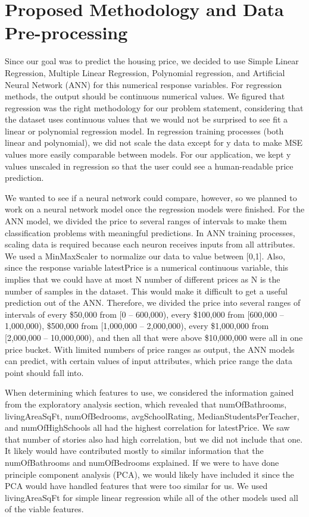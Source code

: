 \documentclass[12pt]{article}
\begin{document}
	\section{Proposed Methodology and Data Pre-processing}
	
	Since our goal was to predict the housing price, we decided to use Simple Linear Regression, Multiple Linear Regression, Polynomial regression, and Artificial Neural Network (ANN) for this numerical response variables. For regression methods, the output should be continuous numerical values. We figured that regression was the right methodology for our problem statement, considering that the dataset uses continuous values that we would not be surprised to see fit a linear or polynomial regression model. In regression training processes (both linear and polynomial), we did not scale the data except for y data to make MSE values more easily comparable between models. For our application, we kept y values unscaled in regression so that the user could see a human-readable price prediction.
	
	We wanted to see if a neural network could compare, however, so we planned to work on a neural network model once the regression models were finished. For the ANN model, we divided the price to several ranges of intervals to make them classification problems with meaningful predictions. In ANN training processes, scaling data is required because each neuron receives inputs from all attributes. We used a MinMaxScaler to normalize our data to value between [0,1]. Also, since the response variable latestPrice is a numerical continuous variable, this implies that we could have at most N number of different prices as N is the number of samples in the dataset. This would make it difficult to get a useful prediction out of the ANN. Therefore, we divided the price into several ranges of intervals of every \$50,000 from [0 – 600,000), every \$100,000 from [600,000 – 1,000,000), \$500,000 from [1,000,000 – 2,000,000), every \$1,000,000 from [2,000,000 – 10,000,000), and then all that were above \$10,000,000 were all in one price bucket. With limited numbers of price ranges as output, the ANN models can predict, with certain values of input attributes, which price range the data point should fall into.
	
	When determining which features to use, we considered the information gained from the exploratory analysis section, which revealed that numOfBathrooms, livingAreaSqFt, numOfBedrooms, avgSchoolRating, MedianStudentsPerTeacher, and numOfHighSchools all had the highest correlation for latestPrice. We saw that number of stories also had high correlation, but we did not include that one. It likely would have contributed mostly to similar information that the numOfBathrooms and numOfBedrooms explained. If we were to have done principle component analysis (PCA), we would likely have included it since the PCA would have handled features that were too similar for us. We used livingAreaSqFt for simple linear regression while all of the other models used all of the viable features.
	
\end{document}
